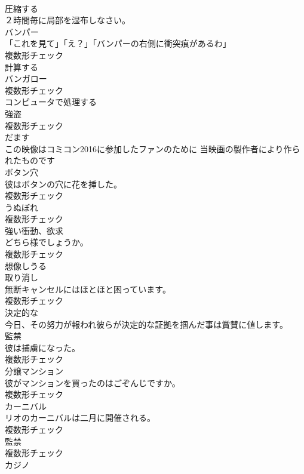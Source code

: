 \documentclass[8pt]{extreport}
\begin{document}
\begin{CJK}{UTF8}{min}
\\	[動詞]	圧縮する	
\\	２時間毎に局部を湿布しなさい。	
\\	[名詞]	バンパー	
\\	「これを見て」「え？」「バンパーの右側に衝突痕があるわ」	
\\	複数形チェック
\\	[動詞]	計算する	
\\	[名詞]	バンガロー	
\\	複数形チェック
\\	[動詞]	コンピュータで処理する	
\\	[名詞]	強盗	
\\	複数形チェック
\\	[動詞]	だます	
\\	この映像はコミコン2016に参加したファンのために 当映画の製作者により作られたものです	
\\	[名詞]	ボタン穴	
\\	彼はボタンの穴に花を挿した。	
\\	複数形チェック
\\	[名詞]	うぬぼれ	
\\	複数形チェック
\\	[名詞]	強い衝動、欲求	
\\	どちら様でしょうか。	
\\	複数形チェック
\\	[形容詞]	想像しうる	
\\	[名詞]	取り消し	
\\	無断キャンセルにはほとほと困っています。	
\\	複数形チェック
\\	[形容詞]	決定的な	
\\	今日、その努力が報われ彼らが決定的な証拠を掴んだ事は賞賛に値します。	
\\	[名詞]	監禁	
\\	彼は捕虜になった。	
\\	複数形チェック
\\	[名詞]	分譲マンション	
\\	彼がマンションを買ったのはごぞんじですか。	
\\	複数形チェック
\\	[名詞]	カーニバル	
\\	リオのカーニバルは二月に開催される。	
\\	複数形チェック
\\	[名詞]	監禁	
\\	複数形チェック
\\	[名詞]	カジノ	

\end{CJK}
\end{document}
